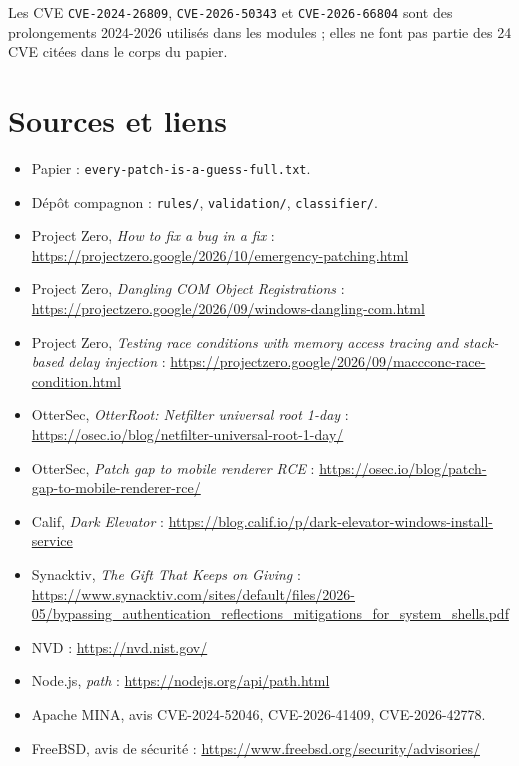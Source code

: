 \documentclass{training}
\begin{document}
Les CVE \texttt{CVE-2024-26809}, \texttt{CVE-2026-50343} et
\texttt{CVE-2026-66804} sont des prolongements 2024-2026 utilisés dans les
modules ; elles ne font pas partie des 24 CVE citées dans le corps du papier.

\chapter{Sources et liens}

\begin{itemize}
  \item Papier : \texttt{every-patch-is-a-guess-full.txt}.
  \item Dépôt compagnon : \texttt{rules/}, \texttt{validation/},
        \texttt{classifier/}.
  \item Project Zero, \emph{How to fix a bug in a fix} :
        \url{https://projectzero.google/2026/10/emergency-patching.html}
  \item Project Zero, \emph{Dangling COM Object Registrations} :
        \url{https://projectzero.google/2026/09/windows-dangling-com.html}
  \item Project Zero, \emph{Testing race conditions with memory access
        tracing and stack-based delay injection} :
        \url{https://projectzero.google/2026/09/maccconc-race-condition.html}
  \item OtterSec, \emph{OtterRoot: Netfilter universal root 1-day} :
        \url{https://osec.io/blog/netfilter-universal-root-1-day/}
  \item OtterSec, \emph{Patch gap to mobile renderer RCE} :
        \url{https://osec.io/blog/patch-gap-to-mobile-renderer-rce/}
  \item Calif, \emph{Dark Elevator} :
        \url{https://blog.calif.io/p/dark-elevator-windows-install-service}
  \item Synacktiv, \emph{The Gift That Keeps on Giving} :
        \url{https://www.synacktiv.com/sites/default/files/2026-05/bypassing_authentication_reflections_mitigations_for_system_shells.pdf}
  \item NVD : \url{https://nvd.nist.gov/}
  \item Node.js, \emph{path} : \url{https://nodejs.org/api/path.html}
  \item Apache MINA, avis CVE-2024-52046, CVE-2026-41409, CVE-2026-42778.
  \item FreeBSD, avis de sécurité :
        \url{https://www.freebsd.org/security/advisories/}
\end{itemize}
\end{document}
